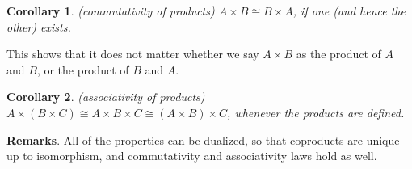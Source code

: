 \documentclass[12pt]{article}
\newtheorem{cor}{Corollary}
\begin{document}
\begin{cor} (commutativity of products)  $A\times B\cong B\times A$, if one (and hence the other) exists. \end{cor}

This shows that it does not matter whether we say $A\times B$ as the product of $A$ and $B$, or the product of $B$ and $A$.

\begin{cor} (associativity of products)  $A\times (B\times C)\cong A\times B\times C \cong (A\times B)\times C$, whenever the products are defined. \end{cor}

\textbf{Remarks}.  All of the properties can be dualized, so that coproducts are unique up to isomorphism, and commutativity and associativity laws hold as well.
\end{document}
